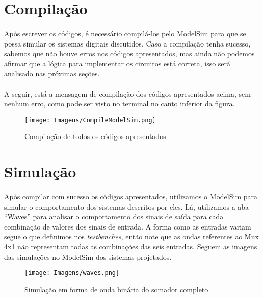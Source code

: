 \documentclass[a4paper,12pt]{article}
\begin{document}
\section{Compilação}
\paragraph{}
Após escrever os códigos, é necessário compilá-los pelo ModelSim para que se possa simular os sistemas digitais discutidos. Caso a compilação tenha sucesso, sabemos que não houve erros nos códigos apresentados, mas ainda não podemos afirmar que a lógica para implementar os circuitos está correta, isso será analisado nas próximas seções.

\paragraph{}
A seguir, está a mensagem de compilação dos códigos apresentados acima, sem nenhum erro, como pode ser visto no terminal no canto inferior da figura.

\begin{figure}[H]
    \centering
    \texttt{[image: Imagens/CompileModelSim.png]}
    \caption{Compilação de todos os códigos apresentados}
\end{figure}

\newpage

\section{Simulação}
\paragraph{}
Após compilar com sucesso os códigos apresentados, utilizamos o ModelSim para simular o comportamento dos sistemas descritos por eles. Lá, utilizamos a aba ``Waves'' para analisar o comportamento dos sinais de saída para cada combinação de valores dos sinais de entrada. A forma como as entradas variam segue o que definimos nos \textit{testbenches}, então note que as ondas referentes ao Mux 4x1 não representam todas as combinações das seis entradas. Seguem as imagens das simulações no ModelSim dos sistemas projetados.

\begin{figure}[H]
    \centering
    \begin{tcolorbox}[colframe=darkgray, colback=white, boxrule=0.5pt, arc=2pt, width=0.95\textwidth, center, boxsep=0pt, left=0pt, right=0pt]
    \texttt{[image: Imagens/waves.png]}
    \end{tcolorbox}
    \caption{Simulação em forma de onda binária do somador completo}
\end{figure}
\end{document}
